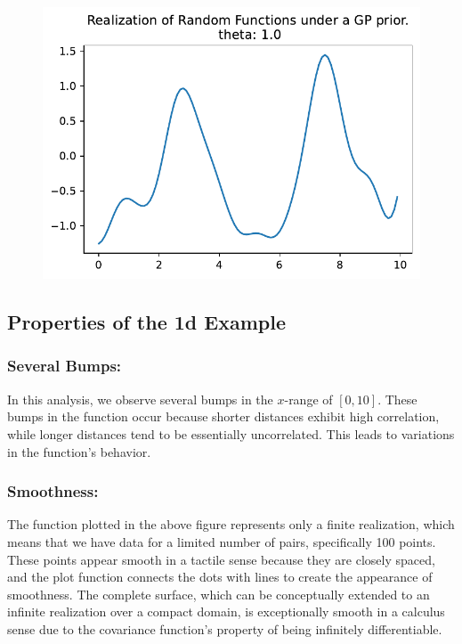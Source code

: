 \documentclass[
  letterpaper,
  DIV=11,
  numbers=noendperiod]{scrreprt}
\begin{document}
\begin{figure}[H]

{\centering \includegraphics{006_num_gp_files/figure-pdf/cell-29-output-1.pdf}

}

\end{figure}

\hypertarget{properties-of-the-1d-example}{%
\subsection{Properties of the 1d
Example}\label{properties-of-the-1d-example}}

\hypertarget{several-bumps}{%
\subsubsection{Several Bumps:}\label{several-bumps}}

In this analysis, we observe several bumps in the \(x\)-range of
\([0,10]\). These bumps in the function occur because shorter distances
exhibit high correlation, while longer distances tend to be essentially
uncorrelated. This leads to variations in the function's behavior.

\hypertarget{smoothness}{%
\subsubsection{Smoothness:}\label{smoothness}}

The function plotted in the above figure represents only a finite
realization, which means that we have data for a limited number of
pairs, specifically 100 points. These points appear smooth in a tactile
sense because they are closely spaced, and the plot function connects
the dots with lines to create the appearance of smoothness. The complete
surface, which can be conceptually extended to an infinite realization
over a compact domain, is exceptionally smooth in a calculus sense due
to the covariance function's property of being infinitely
differentiable.
\end{document}
